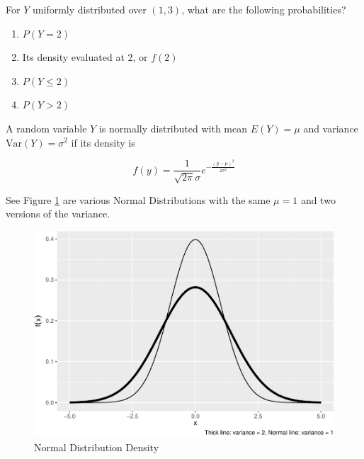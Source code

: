 \documentclass[
]{book}
\begin{document}
\begin{example}
\protect\hypertarget{exm:unnamed-chunk-92}{}\label{exm:unnamed-chunk-92}

For \(Y\) uniformly distributed over \((1,3)\), what are the following probabilities?

\begin{enumerate}
\def\labelenumi{\arabic{enumi}.}
\tightlist
\item
  \(P(Y=2)\)
\item
  Its density evaluated at 2, or \(f(2)\)
\item
  \(P(Y \le 2)\)
\item
  \(P(Y > 2)\)
\end{enumerate}

\end{example}

\begin{definition}
\protect\hypertarget{def:unnamed-chunk-93}{}\label{def:unnamed-chunk-93}A random variable \(Y\) is normally distributed with mean \(E(Y)=\mu\) and variance \(\text{Var}(Y)=\sigma^2\) if its density is

\[f(y)=\frac{1}{\sqrt{2\pi}\sigma}e^{-\frac{(y-\mu)^2}{2\sigma^2}}\]
\end{definition}

See Figure \ref{fig:normaldens} are various Normal Distributions with the same \(\mu = 1\) and two versions of the variance.

\begin{figure}
\centering
\includegraphics{figure-latex/normaldens-1.pdf}
\caption{\label{fig:normaldens}Normal Distribution Density}
\end{figure}
\end{document}
